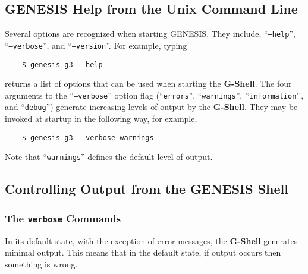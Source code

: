 \documentclass[12pt]{article}
\begin{document}



\subsection*{GENESIS Help from the Unix Command Line}
Several options are recognized when starting GENESIS. They include, ``{\tt --help}'', ``{\tt --verbose}'', and ``{\tt --version}''. For example, typing
\begin{verbatim}
    $ genesis-g3 --help
\end{verbatim}
returns a list of options that can be used when starting the {\bf G-Shell}.
The four arguments to the ``{\tt --verbose}'' option flag (``{\tt errors}'', ``{\tt warnings}'', '`{\tt information}'', and ``{\tt debug}'') generate increasing levels of output by the {\bf G-Shell}. They may be invoked at startup in the following way, for example,
\begin{verbatim}
    $ genesis-g3 --verbose warnings
\end{verbatim}
Note that ``{\tt warnings}'' defines the default level of output.

\subsection*{Controlling Output from the GENESIS Shell}

\subsubsection*{The {\tt verbose} Commands}

In its default state, with the exception of error messages, the {\bf G-Shell} generates minimal output. This means that in the default state, if output occurs then something is wrong.
\end{document}
